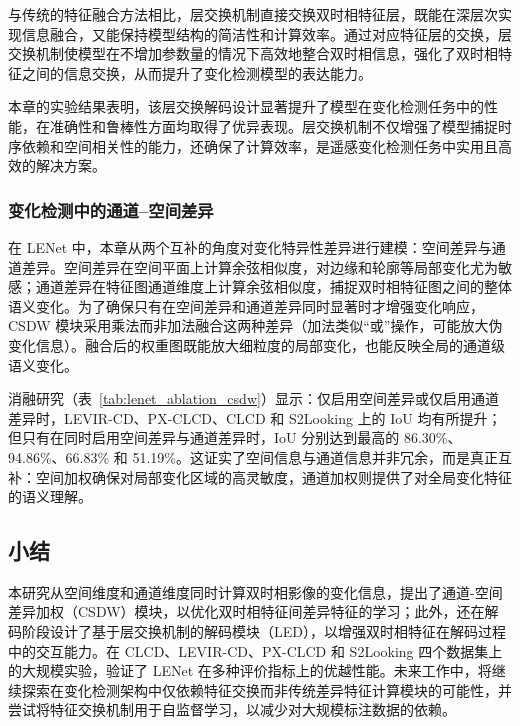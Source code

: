与传统的特征融合方法相比，层交换机制直接交换双时相特征层，既能在深层次实现信息融合，又能保持模型结构的简洁性和计算效率。通过对应特征层的交换，层交换机制使模型在不增加参数量的情况下高效地整合双时相信息，强化了双时相特征之间的信息交换，从而提升了变化检测模型的表达能力。

本章的实验结果表明，该层交换解码设计显著提升了模型在变化检测任务中的性能，在准确性和鲁棒性方面均取得了优异表现。层交换机制不仅增强了模型捕捉时序依赖和空间相关性的能力，还确保了计算效率，是遥感变化检测任务中实用且高效的解决方案。

\subsubsection{变化检测中的通道–空间差异}
在 LENet 中，本章从两个互补的角度对变化特异性差异进行建模：空间差异与通道差异。空间差异在空间平面上计算余弦相似度，对边缘和轮廓等局部变化尤为敏感；通道差异在特征图通道维度上计算余弦相似度，捕捉双时相特征图之间的整体语义变化。为了确保只有在空间差异和通道差异同时显著时才增强变化响应，CSDW 模块采用乘法而非加法融合这两种差异（加法类似“或”操作，可能放大伪变化信息）。融合后的权重图既能放大细粒度的局部变化，也能反映全局的通道级语义变化。

消融研究（表~\ref{tab:lenet_ablation_csdw}）显示：仅启用空间差异或仅启用通道差异时，LEVIR-CD、PX-CLCD、CLCD 和 S2Looking 上的 IoU 均有所提升；但只有在同时启用空间差异与通道差异时，IoU 分别达到最高的 86.30\%、94.86\%、66.83\% 和 51.19\%。这证实了空间信息与通道信息并非冗余，而是真正互补：空间加权确保对局部变化区域的高灵敏度，通道加权则提供了对全局变化特征的语义理解。


\subsection{小结}

本研究从空间维度和通道维度同时计算双时相影像的变化信息，提出了通道-空间差异加权（CSDW）模块，以优化双时相特征间差异特征的学习；此外，还在解码阶段设计了基于层交换机制的解码模块（LED），以增强双时相特征在解码过程中的交互能力。在 CLCD、LEVIR-CD、PX-CLCD 和 S2Looking 四个数据集上的大规模实验，验证了 LENet 在多种评价指标上的优越性能。未来工作中，将继续探索在变化检测架构中仅依赖特征交换而非传统差异特征计算模块的可能性，并尝试将特征交换机制用于自监督学习，以减少对大规模标注数据的依赖。

